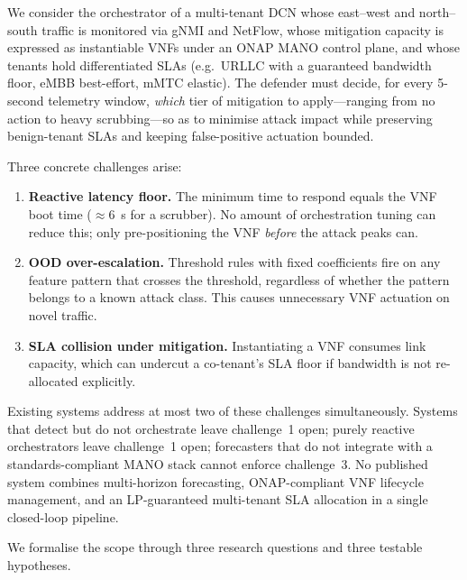 
We consider the orchestrator of a multi-tenant DCN whose east--west and
north--south traffic is monitored via gNMI and NetFlow, whose mitigation
capacity is expressed as instantiable VNFs under an ONAP MANO control plane,
and whose tenants hold differentiated SLAs (e.g.~URLLC with a guaranteed
bandwidth floor, eMBB best-effort, mMTC elastic). The defender must decide,
for every 5-second telemetry window, \emph{which} tier of mitigation to
apply---ranging from no action to heavy scrubbing---so as to minimise attack
impact while preserving benign-tenant SLAs and keeping false-positive
actuation bounded.

Three concrete challenges arise:

\begin{enumerate}
  \item \textbf{Reactive latency floor.} The minimum time to respond equals
        the VNF boot time ($\approx 6$~s for a scrubber). No amount of
        orchestration tuning can reduce this; only pre-positioning the VNF
        \emph{before} the attack peaks can.

  \item \textbf{OOD over-escalation.} Threshold rules with fixed coefficients
        fire on any feature pattern that crosses the threshold, regardless of
        whether the pattern belongs to a known attack class. This causes
        unnecessary VNF actuation on novel traffic.

  \item \textbf{SLA collision under mitigation.} Instantiating a VNF consumes
        link capacity, which can undercut a co-tenant's SLA floor if bandwidth
        is not re-allocated explicitly.
\end{enumerate}

Existing systems address at most two of these challenges simultaneously.
Systems that detect but do not orchestrate leave challenge~1 open; purely
reactive orchestrators leave challenge~1 open; forecasters that do not
integrate with a standards-compliant MANO stack cannot enforce challenge~3.
No published system combines multi-horizon forecasting, ONAP-compliant VNF
lifecycle management, and an LP-guaranteed multi-tenant SLA allocation in
a single closed-loop pipeline.

We formalise the scope through three research questions and three testable
hypotheses.

